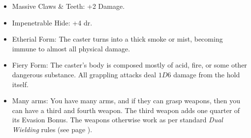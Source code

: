\begin{multicols}{2}
\begin{itemize}
	\item{Massive Claws \& Teeth: +2 Damage.}
	\item{Impenetrable Hide: +4 \gls{dr}.}
	\item{Etherial Form: The caster turns into a thick smoke or mist, becoming immune to almost all physical damage.}
	\item{Fiery Form: The caster's body is composed mostly of acid, fire, or some other dangerous substance.
	All grappling attacks deal $1D6$ damage from the hold itself.}
	\item{Many arms: You have many arms, and if they can grasp weapons, then you can have a third and fourth weapon.  The third weapon adds one quarter of its Evasion Bonus.  The weapons otherwise work as per standard \textit{Dual Wielding} rules (see page \pageref{dualWielding}).}

\end{itemize}

\end{multicols}

\stopcontents[magic]


